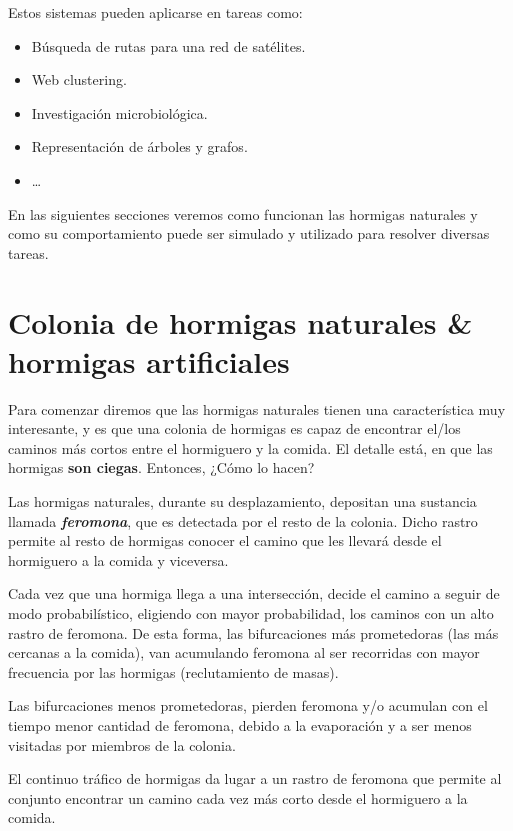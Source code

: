 \documentclass[10pt,a4paper]{article}
\begin{document}
Estos sistemas pueden aplicarse en tareas como:

\begin{center}
\begin{itemize}
\item Búsqueda de rutas para una red de satélites. 
\item Web clustering. 
\item Investigación microbiológica. 
\item Representación de árboles y grafos.
\item \ldots
\end{itemize}
\end{center}

En las siguientes secciones veremos como funcionan las hormigas naturales y como su comportamiento puede ser simulado y utilizado para resolver diversas tareas.

\section{Colonia de hormigas naturales \& hormigas artificiales}

Para comenzar diremos que las hormigas naturales tienen una característica muy interesante, y es que una colonia de hormigas es capaz de encontrar el/los caminos más cortos entre el hormiguero y la comida. El detalle está, en que las hormigas \textbf{son ciegas}. Entonces, ¿Cómo lo hacen?

Las hormigas naturales, durante su desplazamiento, depositan una sustancia llamada \textbf{\textit{feromona}}, que es detectada por el resto de la colonia. Dicho rastro permite al resto de hormigas conocer el camino que les llevará desde el hormiguero a la comida y viceversa.

Cada vez que una hormiga llega a una intersección, decide el camino a seguir de modo probabilístico, eligiendo con mayor probabilidad, los caminos con un alto rastro de feromona. De esta forma, las bifurcaciones más prometedoras (las más cercanas a la comida), van acumulando feromona al ser recorridas con mayor frecuencia por las hormigas (reclutamiento de masas). 

Las bifurcaciones menos prometedoras, pierden feromona y/o acumulan con el tiempo menor cantidad de feromona, debido a la evaporación y a ser menos visitadas por miembros de la colonia.

El continuo tráfico de hormigas da lugar a un rastro de feromona que permite al conjunto encontrar un camino cada vez más corto desde el hormiguero a la comida.
\end{document}
